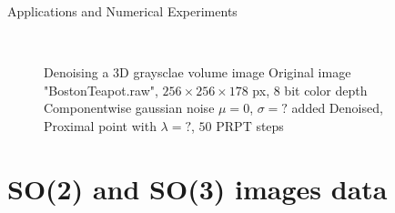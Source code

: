 \begin{chapter}{Applications and Numerical Experiments}
\begin{figure}[h!]
    \centering
    \\
    \caption[Denoising 3D Grayscale Volume Data]{Denoising a 3D graysclae volume image
	 Original image "BostonTeapot.raw", $256\times 256 \times 178$ px, 8 bit color depth
	 Componentwise gaussian noise $\mu=0$, $\sigma=?$ added
	 Denoised, Proximal point with $\lambda=?$, $50$ PRPT steps
	\label{fig:application_volume1}
    }
\end{figure}


\FloatBarrier
\section{SO(2) and SO(3) images data} %
\label{sec:SO images data}


\end{chapter}
